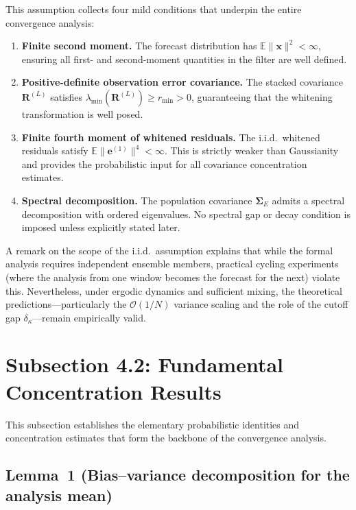 \documentclass[11pt]{article}
\begin{document}
This assumption collects four mild conditions that underpin the entire
convergence analysis:
\begin{enumerate}[label=(\roman*)]
  \item \textbf{Finite second moment.} The forecast distribution has
    $\mathbb{E}\|\mathbf{x}\|^2 < \infty$, ensuring all first- and
    second-moment quantities in the filter are well defined.
  \item \textbf{Positive-definite observation error covariance.} The stacked
    covariance $\mathbf{R}^{(L)}$ satisfies
    $\lambda_{\min}(\mathbf{R}^{(L)}) \ge r_{\min} > 0$, guaranteeing that
    the whitening transformation is well posed.
  \item \textbf{Finite fourth moment of whitened residuals.} The i.i.d.\
    whitened residuals satisfy
    $\mathbb{E}\|\mathbf{e}^{(1)}\|^4 < \infty$. This is strictly weaker
    than Gaussianity and provides the probabilistic input for all covariance
    concentration estimates.
  \item \textbf{Spectral decomposition.} The population covariance
    $\boldsymbol{\Sigma}_E$ admits a spectral decomposition with ordered
    eigenvalues. No spectral gap or decay condition is imposed unless
    explicitly stated later.
\end{enumerate}

\noindent
A remark on the scope of the i.i.d.\ assumption explains that while the formal
analysis requires independent ensemble members, practical cycling experiments
(where the analysis from one window becomes the forecast for the next) violate
this. Nevertheless, under ergodic dynamics and sufficient mixing, the
theoretical predictions---particularly the $\mathcal{O}(1/N)$ variance scaling
and the role of the cutoff gap $\delta_\kappa$---remain empirically valid.


\section*{Subsection 4.2: Fundamental Concentration Results}

This subsection establishes the elementary probabilistic identities and
concentration estimates that form the backbone of the convergence analysis.

\subsection*{Lemma~1 (Bias--variance decomposition for the analysis mean)}
\end{document}
